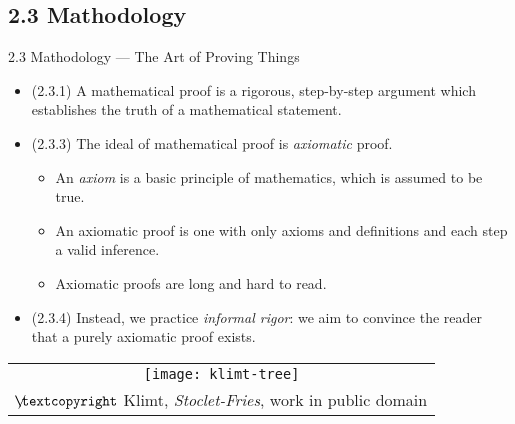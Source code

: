\subsection{2.3 Mathodology}

\begin{frame}{2.3 Mathodology --- The Art of Proving Things}

	\begin{itemize}
	
		\item (2.3.1) A mathematical proof is a rigorous, step-by-step argument which establishes the truth of a mathematical statement.
	
		\item (2.3.3) The ideal of mathematical proof is \emph{axiomatic} proof.
		
		\begin{itemize}
		
			\item An \emph{axiom} is a basic principle of mathematics, which is assumed to be true.
			
			\item An axiomatic proof is one with only axioms and definitions and each step a valid inference.
			
			\item Axiomatic proofs are long and hard to read.
		
		\end{itemize}
		
		\item (2.3.4) Instead, we practice \emph{informal rigor}: we aim to convince the reader that a purely axiomatic proof exists.
	
	\end{itemize}
	
	
	\begin{center}
		\begin{tabular}{c}
		\texttt{[image: klimt-tree]}\\[-1ex]
		{\tiny $\not\hspace{-1ex}\textcopyright$ Klimt, \emph{Stoclet-Fries}, work in public domain}
		\end{tabular}
		\end{center}


\end{frame}

